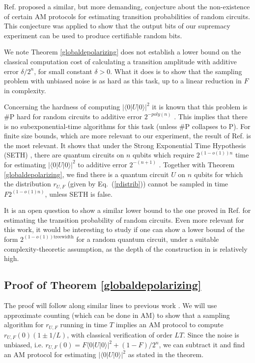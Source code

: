 Ref. \cite{Aa19} proposed a similar, but more demanding, conjecture about the non-existence of certain AM protocols for estimating transition probabilities of random circuits. This conjecture was applied to show that the output bits of our supremacy experiment can be used to produce certifiable random bits. 

We note Theorem \ref{globaldepolarizing} does not establish a lower bound on the classical computation cost of calculating a transition amplitude with additive error $\delta/{2^{n}}$, for small constant $\delta > 0$. What it does is to show that the sampling problem with unbiased noise is as hard as this task, up to a linear reduction in $F$ in complexity. 

Concerning the hardness of computing $|\langle 0| U | 0 \rangle|^2$ it is known that this problem is $\#\text{P}$ hard for random circuits to additive error $2^{-poly(n)}$ \cite{Bou19}. This implies that there is no subexponential-time algorithms for this task (unless $\#\text{P}$ collapses to P). For finite size bounds, which are more relevant to our experiment, the result of Ref. \cite{CNS18} is the most relevant. It shows that under the Strong Exponential Time Hypothesis (SETH) \cite{calabro2009complexity}, there are quantum circuits on $n$ qubits which require $2^{(1 - o(1))n}$ time for estimating $|\langle 0 | U |0 \rangle|^2$ to additive error $2^{-(n+1)}$ \cite{Note3}. Together with Theorem \ref{globaldepolarizing}, we find there is a quantum circuit $U$ on $n$ qubits for which the distribution $r_{U, F}$ (given by Eq.~(\ref{rdistrib})) cannot be sampled in time $F2^{(1-o(1)n)}$, unless SETH is false. 

It is an open question to show a similar lower bound to the one proved in Ref. \cite{CNS18} for estimating the transition probability of random circuits. Even more relevant for this work, it would be interesting to study if one can show a lower bound of the form $2^{(1 - o(1))\text{treewidth}}$ for a random quantum circuit, under a suitable complexity-theoretic assumption, as the depth of the construction in  \cite{CNS18} is relatively high.  

\subsection{Proof of Theorem \ref{globaldepolarizing}}

The proof will follow along similar lines to previous work \cite{AA11, BM16, HM17}. We will use approximate counting (which can be done in AM) to show that a sampling algorithm for $r_{U, F}$ running in time $T$ implies an AM protocol to
compute $r_{U, F}(0)(1 \pm 1/L)$, with classical verification of order $LT$. Since the noise is unbiased, i.e. $r_{U, F}(0) = F\langle 0 | U | 0 \rangle |^2 + (1-F)/2^n$, we can subtract it and find an AM protocol for estimating $|\langle 0 | U | 0 \rangle |^2$ as stated in the theorem.      

